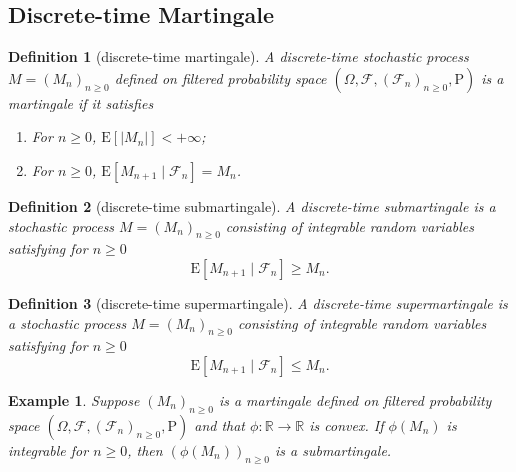 \documentclass{article}
\newtheorem{definition}{Definition}[section]
\newtheorem{example}{Example}[section]
\theoremstyle{nonumberplain}
\begin{document}
\subsection{Discrete-time Martingale}
\begin{definition}[discrete-time martingale]
	A discrete-time stochastic process $M=(M_n)_{n\ge 0}$ defined on filtered probability space $(\Omega,\mathcal{F},(\mathcal{F}_{n})_{n\ge0},\mathrm{P})$ is a \emph{martingale} if it satisfies
	\begin{enumerate}
		\item For $n\ge0$, $\mathrm{E}[|M_n|]<+\infty$;
		\item For $n\ge0$, $\mathrm{E}[M_{n+1}\mid\mathcal{F}_n]=M_n$.
	\end{enumerate}
\end{definition}
\begin{definition}[discrete-time submartingale]
A discrete-time \emph{submartingale} is a stochastic process $M=(M_n)_{n\ge 0}$ consisting of integrable random variables satisfying for $n\ge0$
\[
\mathrm{E}[M_{n+1}\mid\mathcal{F}_n]\ge M_n.
\]
\end{definition}
\begin{definition}[discrete-time supermartingale]
	A discrete-time \emph{supermartingale} is a stochastic process $M=(M_n)_{n\ge 0}$ consisting of integrable random variables satisfying for $n\ge0$
	\[
	\mathrm{E}[M_{n+1}\mid\mathcal{F}_n]\le M_n.
	\]
\end{definition}

\begin{example}
	Suppose $(M_n)_{n\ge 0}$ is a martingale defined on filtered probability space $(\Omega,\mathcal{F},(\mathcal{F}_{n})_{n\ge0},\mathrm{P})$ and that $\phi:\mathbb{R}\to\mathbb{R}$ is convex. If $\phi(M_n)$ is integrable for $n\ge0$, then $\left(\phi(M_n)\right)_{n\ge 0}$ is a submartingale.
\end{example}
\end{document}
